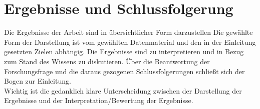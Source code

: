 \chapter{Ergebnisse und Schlussfolgerung} \label{cha:resultsAndConclusion}
Die Ergebnisse der Arbeit sind in übersichtlicher Form darzustellen Die gewählte Form der Darstellung ist 
vom gewählten Datenmaterial und den in der Einleitung gesetzten Zielen abhängig. Die Ergebnisse sind zu 
interpretieren und in Bezug zum Stand des Wissens zu diskutieren. Über die Beantwortung der Forschungsfrage 
und die daraus gezogenen Schlussfolgerungen schließt sich der Bogen zur Einleitung.\\
Wichtig ist die gedanklich klare Unterscheidung zwischen der Darstellung der Ergebnisse und 
der Interpretation/Bewertung der Ergebnisse.